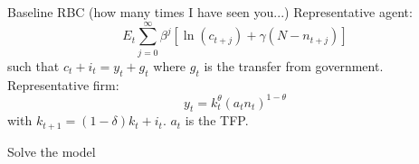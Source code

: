 \documentclass[10pt]{beamer}
\begin{document}
\begin{frame}{Baseline RBC (how many times I have seen you...)}
    Representative agent:
    \begin{equation}
        E_{t} \sum_{j=0}^{\infty} \beta^{j} \left[\ln (c_{t+j})+\gamma(N-n_{t+j})\right]
    \end{equation}
    such that $c_t + i_t = y_t + g_t$  where \alert{$g_t$} is the transfer from government.\\
    Representative firm:
    \begin{equation}
        y_t = k_t^{\theta} (a_t n_t)^{1-\theta}
    \end{equation}
    with $k_{t+1} = (1-\delta) k_t + i_t$. \alert{$a_t$} is the TFP. \\[1em]

\end{frame}

\begin{frame}{Solve the model}

\end{frame}
\end{document}
